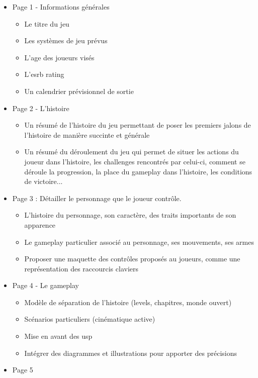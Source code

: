 \begin{itemize}
    \item Page 1 - Informations générales
    \begin{itemize}
        \item Le titre du jeu
        \item Les systèmes de jeu prévus
        \item L'age des joueurs visés
        \item L'\gls{esrb} rating
        \item Un calendrier prévisionnel de sortie
    \end{itemize}
    \item Page 2 - L'histoire
    \begin{itemize}
        \item Un résumé de l'histoire du jeu permettant de poser les premiers jalons de l'histoire de manière succinte et générale
        \item Un résumé du déroulement du jeu qui permet de situer les actions du joueur dans l'histoire, les challenges rencontrés par celui-ci, comment se déroule la progression, la place du gameplay dans l'histoire, les conditions de victoire...
    \end{itemize}
    \item Page 3 : Détailler le personnage que le joueur contrôle.
    \begin{itemize}
        \item L'histoire du personnage, son caractère, des traits importants de son apparence
        \item Le gameplay particulier associé au personnage, ses mouvements, ses armes
        \item Proposer une maquette des contrôles proposés au joueurs, comme une représentation des raccourcis claviers
    \end{itemize}
    \item Page 4 - Le gameplay
    \begin{itemize}
        \item Modèle de séparation de l'histoire (levels, chapitres, monde ouvert)
        \item Scénarios particuliers (cinématique active)
        \item Mise en avant des \gls{usp}
        \item Intégrer des diagrammes et illustrations pour apporter des précisions
    \end{itemize}
    \item Page 5

\end{itemize}
